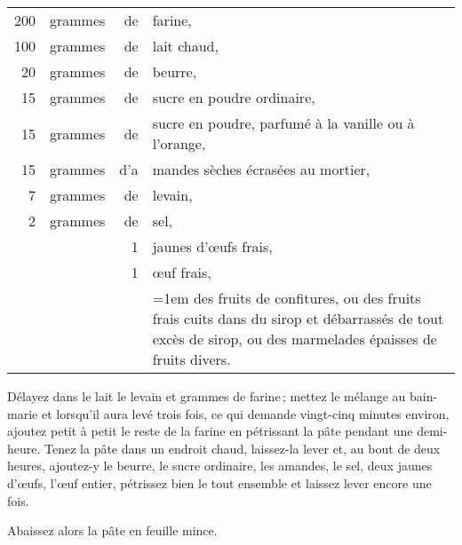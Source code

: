 \footnotesize
\begin{longtable}{rrrp{16em}}
    200 & grammes & de & farine,                                                                          \\
    100 & grammes & de & lait chaud,                                                                      \\
     20 & grammes & de & beurre,                                                                          \\
     15 & grammes & de & sucre en poudre ordinaire,                                                       \\
     15 & grammes & de & sucre en poudre, parfumé à la vanille ou à l'orange,                             \\
     15 & grammes & d'a& mandes sèches écrasées au mortier,                                               \\
      7 & grammes & de & levain,                                                                          \\
      2 & grammes & de & sel,                                                                             \\
        &         &  1 & jaunes d'œufs frais,                                                             \\
        &         &  1 & œuf frais,                                                                       \\
        &         &    & \hangindent=1em des fruits de confitures, ou des fruits frais cuits
                         dans du sirop et débarrassés de tout excès de sirop, ou des marmelades
                         épaisses de fruits divers.                                                       \\
\end{longtable}
\normalsize

Délayez dans le lait le levain et {\mmm} grammes de farine ; mettez le
mélange au bain-marie et lorsqu'il aura levé trois fois, ce qui demande
vingt-cinq minutes environ, ajoutez petit à petit le reste de la farine en
pétrissant la pâte pendant une demi-heure. Tenez la pâte dans un endroit chaud,
laissez-la lever et, au bout de deux heures, ajoutez-y le beurre, le sucre
ordinaire, les amandes, le sel, deux jaunes d'œufs, l'œuf entier, pétrissez
bien le tout ensemble et laissez lever encore une fois.

Abaissez alors la pâte en feuille mince.

